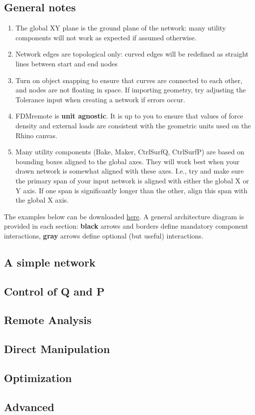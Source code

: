 \subsection{General notes}
\begin{enumerate}
    \item The global XY plane is the ground plane of the network: many utility components will not work as expected if assumed otherwise.
    \item Network edges are topological only: curved edges will be redefined as straight lines between start and end nodes
    \item Turn on object snapping to ensure that curves are connected to each other, and nodes are not floating in space. If importing geometry, try adjusting the Tolerance input when creating a network if errors occur.
    \item FDMremote is \textbf{unit agnostic}. It is up to you to ensure that values of force density and external loads are consistent with the geometric units used on the Rhino canvas.
    \item Many utility components (Bake, Maker, CtrlSurfQ, CtrlSurfP) are based on bounding boxes aligned to the global axes. They will work best when your drawn network is somewhat aligned with these axes. I.e., try and make sure the primary span of your input network is aligned with either the global X or Y axis. If one span is significantly longer than the other, align this span with the global X axis.
\end{enumerate}

The examples below can be downloaded \href{https://www.food4rhino.com/en/app/fdmremote?lang=en}{here}. A general architecture diagram is provided in each section: \textbf{black} arrows and borders define mandatory component interactions, {\color{gray} \textbf{gray}} arrows define optional (but useful) interactions.

\subsection{A simple network}


\subsection{Control of Q and P}


\subsection{Remote Analysis}


\subsection{Direct Manipulation}


\subsection{Optimization}


\subsection{Advanced}